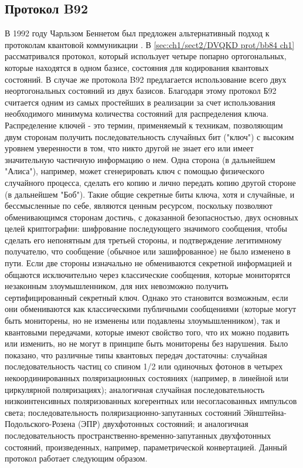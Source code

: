 \subsection{Протокол B92}\label{sec:ch1/sect2/DVQKD prot/b92 ch1}
В 1992 году Чарльзом Беннетом был предложен альтернативный подход к протоколам квантовой коммуникации \cite{bennett1992}. В \ref{sec:ch1/sect2/DVQKD prot/bb84 ch1} рассматривался протокол, который использует четыре попарно ортогональных, которые находятся в одном базисе, состояния  для кодирования квантовых состояний. В случае же протокола B92 предлагается использование всего двух неортогональных состояний из двух базисов. Благодаря этому протокол Б92 считается одним из самых простейших в реализации за счет использования необходимого  минимума количества состояний для распределения ключа.
\newline Распределение ключей - это термин, применяемый к техникам, позволяющим двум сторонам получить последовательность случайных бит ("ключ") с высоким уровнем уверенности в том, что никто другой не знает его или имеет значительную частичную информацию о нем. Одна сторона (в дальнейшем "Алиса"), например, может сгенерировать ключ с помощью физического случайного процесса, сделать его копию и лично передать копию другой стороне (в дальнейшем "Боб"). Такие общие секретные биты ключа, хотя и случайные, и бессмысленные по себе, являются ценным ресурсом, поскольку позволяют обменивающимся сторонам достичь, с доказанной безопасностью, двух основных целей криптографии: шифрование последующего значимого сообщения, чтобы сделать его непонятным для третьей стороны, и подтверждение легитимному получателю, что сообщение (обычное или зашифрованное) не было изменено в пути.
\newline Если две стороны изначально не обмениваются секретной информацией и общаются исключительно через классические сообщения, которые мониторятся незаконным злоумышленником, для них невозможно получить сертифицированный секретный ключ. Однако это становится возможным, если они обмениваются как классическими публичными сообщениями (которые могут быть мониторены, но не изменены или подавлены злоумышленником), так и квантовыми передачами, которые имеют свойство того, что их можно подавить или изменить, но не могут в принципе быть мониторены без нарушения. Было показано, что различные типы квантовых передач достаточны: случайная последовательность частиц со спином 1/2 или одиночных фотонов в четырех некоординированных поляризационных состояниях (например, в линейной или циркулярной поляризациях); аналогичная случайная последовательность низкоинтенсивных поляризованных когерентных или несогласованных импульсов света; последовательность поляризационно-запутанных состояний Эйнштейна-Подольского-Розена (ЭПР) двухфотонных состояний; и аналогичная последовательность пространственно-временно-запутанных двухфотонных состояний, произведенных, например, параметрической конвертацией. Данный протокол работает следующим образом. 
